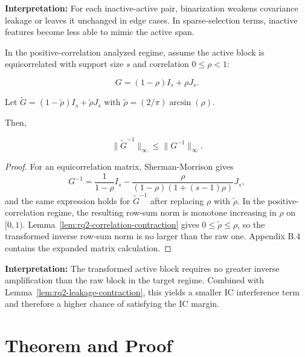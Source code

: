 \textbf{Interpretation:} For each inactive-active pair, binarization weakens covariance leakage or leaves it unchanged in edge cases. In sparse-selection terms, inactive features become less able to mimic the active span.

\begin{lemma}\label{lem:rq2-active-inverse-control}
In the positive-correlation analyzed regime, assume the active block is equicorrelated with support size $s$ and correlation $0\leq\rho<1$:

\begin{equation}\label{eq:rq2-active-equicorrelation-gram}
G=(1-\rho)I_s+\rho J_s.
\end{equation}

Let $\tilde{G}=(1-\tilde{\rho})I_s+\tilde{\rho}J_s$ with $\tilde{\rho}=(2/\pi)\arcsin(\rho)$.

Then,

\begin{equation}\label{eq:rq2-lemma4-active-inverse-bound}
\|\tilde{G}^{-1}\|_\infty \leq \|G^{-1}\|_\infty.
\end{equation}
\end{lemma}

\begin{proof}
For an equicorrelation matrix, Sherman-Morrison gives
\begin{equation}\label{eq:rq2-equicorrelation-inverse}
G^{-1}=\frac{1}{1-\rho}I_s-\frac{\rho}{(1-\rho)(1+(s-1)\rho)}J_s,
\end{equation}
and the same expression holds for $\tilde{G}^{-1}$ after replacing $\rho$ with $\tilde{\rho}$. In the positive-correlation regime, the resulting row-sum norm is monotone increasing in $\rho$ on $[0,1)$. Lemma~\ref{lem:rq2-correlation-contraction} gives $0\leq\tilde{\rho}\leq\rho$, so the transformed inverse row-sum norm is no larger than the raw one. Appendix B.4 contains the expanded matrix calculation.
\end{proof}

\textbf{Interpretation:} The transformed active block requires no greater inverse amplification than the raw block in the target regime. Combined with Lemma~\ref{lem:rq2-leakage-contraction}, this yields a smaller IC interference term and therefore a higher chance of satisfying the IC margin.

\section{Theorem and Proof}

